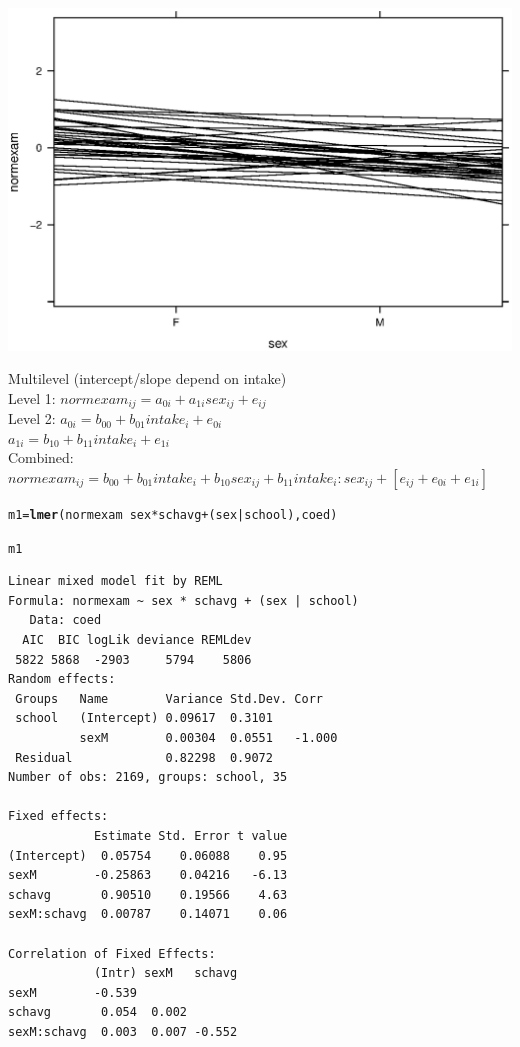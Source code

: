 \documentclass{article}\usepackage{graphicx, color}
\makeatletter
\newcommand{\hlfunctioncall}[1]{\textcolor[rgb]{0.501960784313725,0,0.329411764705882}{\textbf{#1}}}%
\newenvironment{kframe}{%
 \def\at@end@of@kframe{}%
 \ifinner\ifhmode%
  \def\at@end@of@kframe{\end{minipage}}%
  \begin{minipage}{\columnwidth}%
 \fi\fi%
 \def\FrameCommand##1{\hskip\@totalleftmargin \hskip-\fboxsep
 \colorbox{shadecolor}{##1}\hskip-\fboxsep
     \hskip-\linewidth \hskip-\@totalleftmargin \hskip\columnwidth}%
 \MakeFramed {\advance\hsize-\width
   \@totalleftmargin\z@ \linewidth\hsize
   \@setminipage}}%
 {\par\unskip\endMakeFramed%
 \at@end@of@kframe}
\newenvironment{knitrout}{}{} %
\makeatother
\begin{document}
\begin{knitrout}
{\centering \includegraphics[width=\linewidth]{plots/unnamed-chunk-242} 

}



\end{knitrout}


Multilevel (intercept/slope depend on intake)\\
Level 1: $normexam_{ij} = a_{0i} + a_{1i} sex_{ij} + e_{ij}$\\
Level 2: $a_{0i} = b_{00} + b_{01} intake_i + e_{0i}$\\
          $a_{1i} = b_{10} + b_{11} intake_i + e_{1i}$\\
Combined: $normexam_{ij} = b_{00} + b_{01} intake_i + b_{10} sex_{ij} + b_{11} intake_i:sex_{ij} + [e_{ij}+e_{0i}+e_{1i}]$
\begin{knitrout}
\color{fgcolor}\begin{kframe}
\begin{alltt}
m1=\hlfunctioncall{lmer}(normexam~sex*schavg+(sex|school), coed)
\end{alltt}


{\ttfamily\noindent\color{warningcolor}{Warning: singular convergence (7)}}\begin{alltt}
m1
\end{alltt}
\begin{verbatim}
Linear mixed model fit by REML 
Formula: normexam ~ sex * schavg + (sex | school) 
   Data: coed 
  AIC  BIC logLik deviance REMLdev
 5822 5868  -2903     5794    5806
Random effects:
 Groups   Name        Variance Std.Dev. Corr   
 school   (Intercept) 0.09617  0.3101          
          sexM        0.00304  0.0551   -1.000 
 Residual             0.82298  0.9072          
Number of obs: 2169, groups: school, 35

Fixed effects:
            Estimate Std. Error t value
(Intercept)  0.05754    0.06088    0.95
sexM        -0.25863    0.04216   -6.13
schavg       0.90510    0.19566    4.63
sexM:schavg  0.00787    0.14071    0.06

Correlation of Fixed Effects:
            (Intr) sexM   schavg
sexM        -0.539              
schavg       0.054  0.002       
sexM:schavg  0.003  0.007 -0.552
\end{verbatim}
\end{kframe}
\end{knitrout}
\end{document}
